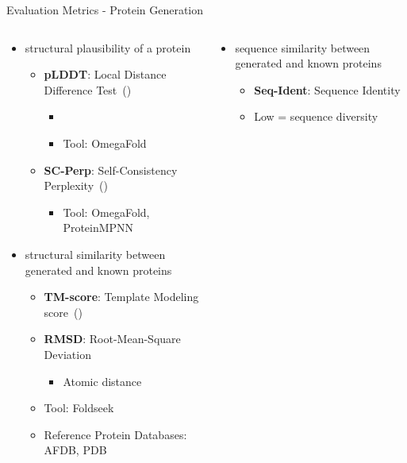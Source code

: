 \begin{frame}[shrink=10]{Evaluation Metrics - Protein Generation}
	\begin{columns}
		\begin{column}{0.5\textwidth}
			\begin{itemize}\setlength\itemsep{1em}
				\item structural plausibility of a protein
				\begin{itemize}
					\item \textbf{pLDDT}: Local Distance Difference Test~(\cite{jumper2021highly})
					\begin{itemize}
						\item {}
						\item Tool: OmegaFold
					\end{itemize}
					\item \textbf{SC-Perp}: Self-Consistency Perplexity~(\cite{alamdari2023protein})
					\begin{itemize}
						\item Tool: OmegaFold, ProteinMPNN
					\end{itemize}
				\end{itemize}
				\item structural similarity between generated and known proteins
				\begin{itemize}
					\item \textbf{TM-score}: Template Modeling score~(\cite{zhang2004scoring})
					\item \textbf{RMSD}:  Root-Mean-Square Deviation
					\begin{itemize}
						\item Atomic distance
					\end{itemize}
					\item Tool: Foldseek
					\item Reference Protein Databases: AFDB, PDB
				\end{itemize}
			\end{itemize}
		\end{column}
		\begin{column}{0.5\textwidth}
			\begin{itemize}\setlength\itemsep{1em}
				\item sequence similarity between generated and known proteins
				\begin{itemize}
					\item \textbf{Seq-Ident}: Sequence Identity
					\item Low = sequence diversity

\end{itemize}
\end{itemize}
\end{column}
\end{columns}
\end{frame}
